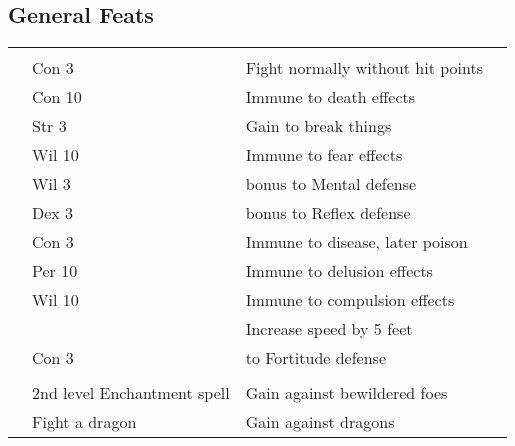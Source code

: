 \subsection{General Feats}
{\small
    \begin{longtabu}{>{\lcol}p{10em} >{\lcol}p{15em} >{\lcol}X >{\lcol}p{3em}}
         &  &  &  \\
         & Con 3 & Fight normally without hit points &  \\
         & Con 10 & Immune to death effects &  \\
         & Str 3 & Gain  to break things &  \\
         & Wil 10 & Immune to fear effects &  \\
         & Wil 3 &  bonus to Mental defense &  \\
         & Dex 3 &   bonus to Reflex defense &  \\
         & Con 3 & Immune to disease, later poison &  \\
         & Per 10 & Immune to delusion effects &  \\
         & Wil 10 & Immune to compulsion effects &  \\
         & \x & Increase speed by 5 feet &  \\
         & Con 3 &  to Fortitude defense &  \\

        \midrule
         &  &  &  \\
         & 2nd level Enchantment spell & Gain  against bewildered foes &  \\
         & Fight a dragon & Gain  against dragons &  \\


\end{longtabu}}
